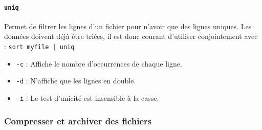 \paragraph{\texttt{uniq}} 
Permet de filtrer les lignes d'un fichier pour n'avoir que des lignes uniques. Les données doivent déjà être triées, il est donc courant d'utiliser  conjointement avec  : \newline \texttt{sort myfile | uniq}
\begin{itemize}
    \item \texttt{-c} : Affiche le nombre d'occurrences de chaque ligne.
    \item \texttt{-d} : N'affiche que les lignes en double.
    \item \texttt{-i} : Le test d'unicité est insensible à la casse.
\end{itemize}

\newpage

\subsubsection{Compresser et archiver des fichiers}

